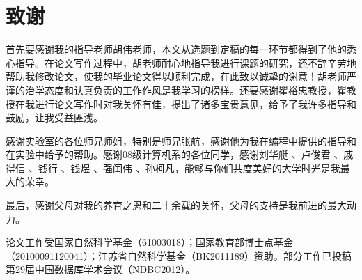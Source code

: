 \chapter*{致\qquad 谢}

首先要感谢我的指导老师胡伟老师，本文从选题到定稿的每一环节都得到了他的悉心指导。在论文写作过程中，胡老师耐心地指导我进行课题的研究，还不辞辛劳地帮助我修改论文，使我的毕业论文得以顺利完成，在此致以诚挚的谢意！胡老师严谨的治学态度和认真负责的工作作风是我学习的榜样。还要感谢瞿裕忠教授，瞿教授在我进行论文写作时对我关怀有佳，提出了诸多宝贵意见，给予了我许多指导和鼓励，让我受益匪浅。

感谢实验室的各位师兄师姐，特别是师兄张航，感谢他为我在编程中提供的指导和在实验中给予的帮助。感谢08级计算机系的各位同学，感谢刘华艇 、卢俊君 、戚得信 、钱行 、钱煜 、强闰伟 、孙柯凡，能够与你们共度美好的大学时光是我最大的荣幸。

最后，感谢父母对我的养育之恩和二十余载的关怀，父母的支持是我前进的最大动力。

论文工作受国家自然科学基金（61003018）；国家教育部博士点基金（20100091120041）；江苏省自然科学基金（BK2011189）资助。部分工作已投稿第29届中国数据库学术会议（NDBC2012）。
